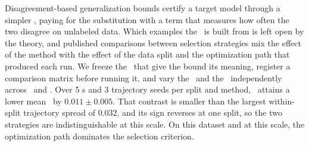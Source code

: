 Disagreement-based generalization bounds certify a target model through a
simpler \surrogate, paying for the substitution with a term that measures how
often the two disagree on unlabeled data. Which examples the \surrogate\ is
built from is left open by the theory, and published comparisons between
selection strategies mix the effect of the method with the effect of the data
split and the optimization path that produced each run. We freeze the \evalsem\
that give the bound its meaning, register a comparison matrix before running it,
and vary the \splitseed\ and the \trajseed\ independently across \methodrandom\
and \methodmax. Over 5 \splitseed{}s and 3 trajectory seeds per split and
method, \methodrandom\ attains a lower mean \certbound\ by $0.011 \pm 0.005$.
That contrast is smaller than the largest within-split trajectory spread of
$0.032$, and its sign reverses at one split, so the two strategies are
indistinguishable at this scale. On this dataset and at this scale, the
optimization path dominates the selection criterion.
